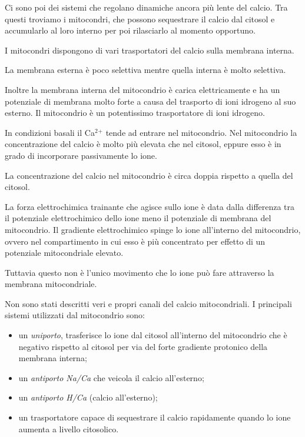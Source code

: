 \documentclass[]{article}
\begin{document}
Ci sono poi dei sistemi che regolano dinamiche ancora più lente del
calcio. Tra questi troviamo i mitocondri, che possono sequestrare il
calcio dal citosol e accumularlo al loro interno per poi rilasciarlo al
momento opportuno.

I mitocondri dispongono di vari trasportatori del calcio sulla membrana
interna.

La membrana esterna è poco selettiva mentre quella interna è molto
selettiva.

Inoltre la membrana interna del mitocondrio è carica elettricamente e ha
un potenziale di membrana molto forte a causa del trasporto di ioni
idrogeno al suo esterno. Il mitocondrio è un potentissimo trasportatore
di ioni idrogeno.

In condizioni basali il Ca\(^2\)\(^+\) tende ad entrare nel mitocondrio.
Nel mitocondrio la concentrazione del calcio è molto più elevata che nel
citosol, eppure esso è in grado di incorporare passivamente lo ione.

La concentrazione del calcio nel mitocondrio è circa doppia rispetto a
quella del citosol.

La forza elettrochimica trainante che agisce sullo ione è data dalla
differenza tra il potenziale elettrochimico dello ione meno il
potenziale di membrana del mitocondrio. Il gradiente elettrochimico
spinge lo ione all'interno del mitocondrio, ovvero nel compartimento in
cui esso è più concentrato per effetto di un potenziale mitocondriale
elevato.

Tuttavia questo non è l'unico movimento che lo ione può fare attraverso
la membrana mitocondriale.

Non sono stati descritti veri e propri canali del calcio mitocondriali.
I principali sistemi utilizzati dal mitocondrio sono:

\begin{itemize}
\itemsep1pt\parskip0pt
\item
  un \emph{uniporto}, trasferisce lo ione dal citosol all'interno del
  mitocondrio che è negativo rispetto al citosol per via del forte
  gradiente protonico della membrana interna;
\item
  un \emph{antiporto Na/Ca} che veicola il calcio all'esterno;
\item
  un \emph{antiporto H/Ca} (calcio all'esterno);
\item
  un trasportatore capace di sequestrare il calcio rapidamente quando lo
  ione aumenta a livello citosolico.
\end{itemize}
\end{document}
